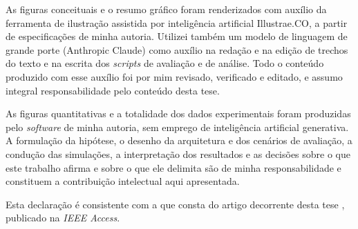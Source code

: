\documentclass[tesedr]{ppgee}
\begin{document}
As figuras conceituais e o resumo gráfico foram renderizados com auxílio da ferramenta
de ilustração assistida por inteligência artificial Illustrae.CO, a partir de
especificações de minha autoria. Utilizei também um modelo de linguagem de grande porte
(Anthropic Claude) como auxílio na redação e na edição de trechos do texto e na escrita
dos \textit{scripts} de avaliação e de análise. Todo o conteúdo produzido com esse
auxílio foi por mim revisado, verificado e editado, e assumo integral responsabilidade
pelo conteúdo desta tese.

As figuras quantitativas e a totalidade dos dados experimentais foram produzidas pelo
\textit{software} de minha autoria, sem emprego de inteligência artificial generativa. A
formulação da hipótese, o desenho da arquitetura e dos cenários de avaliação, a condução
das simulações, a interpretação dos resultados e as decisões sobre o que este trabalho
afirma e sobre o que ele delimita são de minha responsabilidade e constituem a
contribuição intelectual aqui apresentada.

Esta declaração é consistente com a que consta do artigo decorrente desta tese
\cite{MirandaNeto2026TwoLayer}, publicado na \textit{IEEE Access}.

\end{document}

